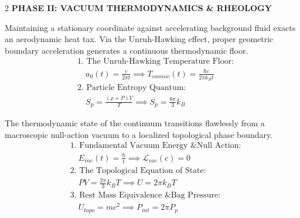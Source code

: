 \documentclass[11pt, a4paper]{article}
\newcounter{cheatnum}
\begin{document}
\begin{multicols}{2}
\vspace{0.4cm}
\noindent\textbf{\large \color{academiabrown} PHASE II: VACUUM THERMODYNAMICS \& RHEOLOGY}
\vspace{0.2cm}

\begin{tcolorbox}[cheatbox, title={\refstepcounter{cheatnum}\label{box:thermo_vacuum}\thecheatnum. Absolute Thermodynamic Vacuum \& Entropy \scriptsize\hfill\hyperref[sec:deriv_thermo_vacuum]{[Proof $\downarrow$]}}]
Maintaining a stationary coordinate against accelerating background fluid exacts an aerodynamic heat tax. Via the Unruh-Hawking effect, proper geometric boundary acceleration generates a continuous thermodynamic floor.
\begin{align}
    &\text{1. The Unruh-Hawking Temperature Floor:} \nonumber \\
    &\quad a_0(t) = \frac{c}{2\pi t} \implies T_{cosmic}(t) = \frac{\hbar c}{2\pi k_B t} \label{eq:tcosmic} \\
    &\text{2. Particle Entropy Quantum:} \nonumber \\
    &\quad S_p = \frac{(\rho + P)V}{T} \implies S_p = \frac{8\pi}{3} k_B \label{eq:sp}
\end{align}
\end{tcolorbox}

\begin{tcolorbox}[cheatbox, title={\refstepcounter{cheatnum}\label{box:unified_eos}\thecheatnum. The Unified Equation of State \scriptsize\hfill\hyperref[sec:deriv_unified_eos]{[Proof $\downarrow$]}}]
The thermodynamic state of the continuum transitions flawlessly from a macroscopic null-action vacuum to a localized topological phase boundary.
\begin{align}
    &\text{1. Fundamental Vacuum Energy \& Null Action:} \nonumber \\
    &\quad E_{vac}(t) = \frac{\hbar}{t} \implies \mathcal{L}_{vac}(c) = 0 \label{eq:vacuum_null_action} \\
    &\text{2. The Topological Equation of State:} \nonumber \\
    &\quad PV = \frac{2\pi}{3} k_B T \implies U = 2\pi k_B T \label{eq:unified_topological_eos} \\
    &\text{3. Rest Mass Equivalence \& Bag Pressure:} \nonumber \\
    &\quad U_{topo} = mc^2 \implies P_{int} = 2\pi P_p \label{eq:unified_pressure_ratio}
\end{align}
\end{tcolorbox}


\end{multicols}
\end{document}
